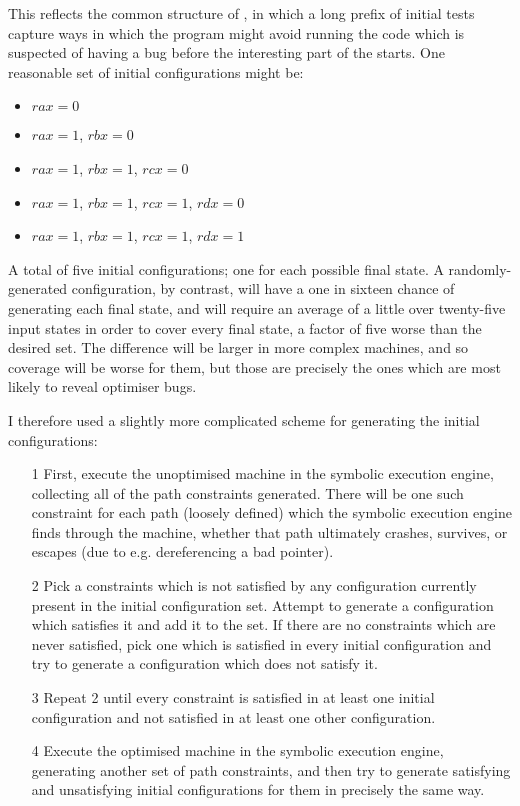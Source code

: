 This reflects the common structure of \StateMachines, in which a long
prefix of initial tests capture ways in which the program might avoid
running the code which is suspected of having a bug before the
interesting part of the \StateMachine starts.  One reasonable set of
initial configurations might be:

\begin{itemize}
\item $rax = 0$
\item $rax = 1$, $rbx = 0$
\item $rax = 1$, $rbx = 1$, $rcx = 0$
\item $rax = 1$, $rbx = 1$, $rcx = 1$, $rdx = 0$
\item $rax = 1$, $rbx = 1$, $rcx = 1$, $rdx = 1$
\end{itemize}

A total of five initial configurations; one for each possible final
state.  A randomly-generated configuration, by contrast, will have a
one in sixteen chance of generating each final state, and will require
an average of a little over twenty-five input states in order to cover
every final state, a factor of five worse than the desired
set.  The difference will be larger in
more complex machines, and so coverage will be worse for them, but
those are precisely the ones which are most likely to reveal optimiser
bugs.

I therefore used a slightly more complicated scheme for generating the
initial configurations:

\begin{itemize}
\item[1] First, execute the unoptimised machine in the symbolic
  execution engine, collecting all of the path constraints generated.
  There will be one such constraint for each path (loosely defined)
  which the symbolic execution engine finds through the machine,
  whether that path ultimately crashes, survives, or escapes (due to
  e.g. dereferencing a bad pointer).
\item[2] Pick a constraints which is not satisfied by any
  configuration currently present in the initial configuration set.
  Attempt to generate a configuration which satisfies it and add it to
  the set.  If there are no constraints which are never satisfied,
  pick one which is satisfied in every initial configuration and try
  to generate a configuration which does not satisfy it.
\item[3] Repeat 2 until every constraint is satisfied in at least one
  initial configuration and not satisfied in at least one other
  configuration.
\item[4] Execute the optimised machine in the symbolic execution
  engine, generating another set of path constraints, and then try to
  generate satisfying and unsatisfying initial configurations for them
  in precisely the same way.
\end{itemize}

